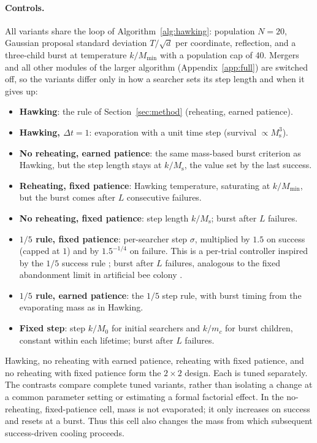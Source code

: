 \documentclass[10pt,a4paper]{article}
\newcommand{\Ms}{M_{\mathrm{s}}}
\newcommand{\Mmin}{M_{\min}}
\begin{document}
\paragraph{Controls.} All variants share the loop of Algorithm~\ref{alg:hawking}:
population $N=20$, Gaussian proposal standard deviation $T/\sqrt d$ per coordinate, reflection,
and a three-child burst at temperature $k/\Mmin$ with a population cap of 40. Mergers
and all other modules of the larger algorithm (Appendix~\ref{app:full}) are switched
off, so the variants differ only in how a searcher sets its step length and when it
gives up:
\begin{itemize}
  \item \textbf{Hawking}: the rule of Section~\ref{sec:method} (reheating, earned patience).
  \item \textbf{Hawking, $\Delta t=1$}: evaporation with a unit time step (survival $\propto \Ms^3$).
  \item \textbf{No reheating, earned patience}: the same mass-based burst criterion as Hawking, but
        the step length stays at $k/\Ms$, the value set by the last success.
  \item \textbf{Reheating, fixed patience}: Hawking temperature, saturating at $k/\Mmin$,
        but the burst comes after $L$ consecutive failures.
  \item \textbf{No reheating, fixed patience}: step length $k/\Ms$; burst after $L$ failures.
  \item \textbf{$1/5$ rule, fixed patience}: per-searcher step $\sigma$, multiplied by
        $1.5$ on success (capped at $1$) and by $1.5^{-1/4}$ on failure. This is a
        per-trial controller inspired by the $1/5$ success rule
        \citep{rechenberg1973,beyer2002}; burst after $L$ failures, analogous to
        the fixed abandonment limit in artificial bee colony \citep{karaboga2007}.
  \item \textbf{$1/5$ rule, earned patience}: the $1/5$ step rule, with burst timing
        from the evaporating mass as in Hawking.
  \item \textbf{Fixed step}: step $k/M_0$ for initial searchers and $k/m_c$ for
        burst children, constant within each lifetime; burst after $L$ failures.
\end{itemize}
Hawking, no reheating with earned patience, reheating with fixed patience, and
no reheating with fixed patience form the $2\times2$ design. Each is tuned
separately. The contrasts compare complete tuned variants, rather than isolating
a change at a common parameter setting or estimating a formal factorial effect.
In the no-reheating, fixed-patience cell, mass is not evaporated; it only increases
on success and resets at a burst. Thus this cell also changes the mass from which
subsequent success-driven cooling proceeds.
\end{document}
